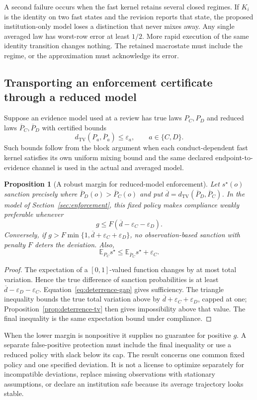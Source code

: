 \documentclass[11pt,letterpaper]{article}
\theoremstyle{plain}
\newtheorem{proposition}{Proposition}[section]
\theoremstyle{definition}
\theoremstyle{remark}
\newcommand{\TV}{d_{\mathrm{TV}}}
\newcommand{\E}{\mathbb E}
\begin{document}
A second failure occurs when the fast kernel retains several closed regimes. If $K_i$ is the identity on two fast states and the revision reports that state, the proposed institution-only model loses a distinction that never mixes away. Any single averaged law has worst-row error at least $1/2$. More rapid execution of the same identity transition changes nothing. The retained macrostate must include the regime, or the approximation must acknowledge its error.

\subsection{Transporting an enforcement certificate through a reduced model}
Suppose an evidence model used at a review has true laws $P_C,P_D$ and reduced laws $\overline P_C,\overline P_D$ with certified bounds
\[
\TV(P_a,\overline P_a)\leq\varepsilon_a,\qquad a\in\{C,D\}.
\]
Such bounds follow from the block argument when each conduct-dependent fast kernel satisfies its own uniform mixing bound and the same declared endpoint-to-evidence channel is used in the actual and averaged model.

\begin{proposition}[A robust margin for reduced-model enforcement]\label{prop:robust-deterrence}
Let $s^\star(o)$ sanction precisely where $\overline P_D(o)>\overline P_C(o)$ and put $\overline d=\TV(\overline P_D,\overline P_C)$. In the model of Section~\ref{sec:enforcement}, this fixed policy makes compliance weakly preferable whenever
\[
g\leq F(\overline d-\varepsilon_C-\varepsilon_D).
\]
Conversely, if $g>F\min\{1,\overline d+\varepsilon_C+\varepsilon_D\}$, no observation-based sanction with penalty $F$ deters the deviation. Also,
\[
\E_{P_C}s^\star\leq\E_{\overline P_C}s^\star+\varepsilon_C.
\]
\end{proposition}
\begin{proof}
The expectation of a $[0,1]$-valued function changes by at most total variation. Hence the true difference of sanction probabilities is at least $\overline d-\varepsilon_D-\varepsilon_C$. Equation~\eqref{eq:deterrence-gap} gives sufficiency. The triangle inequality bounds the true total variation above by $\overline d+\varepsilon_C+\varepsilon_D$, capped at one; Proposition~\ref{prop:deterrence-tv} then gives impossibility above that value. The final inequality is the same expectation bound under compliance.
\end{proof}

When the lower margin is nonpositive it supplies no guarantee for positive $g$. A separate false-positive protection must include the final inequality or use a reduced policy with slack below its cap. The result concerns one common fixed policy and one specified deviation. It is not a license to optimize separately for incompatible deviations, replace missing observations with stationary assumptions, or declare an institution safe because its average trajectory looks stable.
\end{document}
